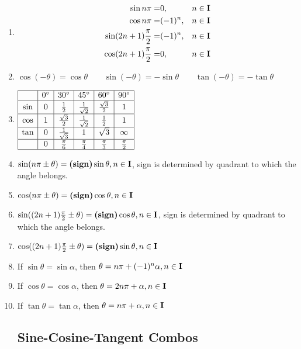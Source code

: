 \documentclass[a4paper]{article}
\begin{document}
\begin{enumerate}
\item
\begin{eqnarray}
\sin n \pi = & 0, & n\in \mathbf{I} \\
\cos n \pi = & (-1)^n, & n\in \mathbf{I} \\
\sin (2n+1)\frac{\pi}{2} = & (-1)^n, & n \in \mathbf{I} \\
\cos (2n+1)\frac{\pi}{2} = & 0, & n \in \mathbf{I}
\end{eqnarray}

\item
$\cos (-\theta) = \cos \theta
\qquad
\sin (-\theta) = -\sin \theta
\qquad
\tan (-\theta) = -\tan \theta$

\item
$\begin{array}{|c|c|c|c|c|c|}
\hline
 & 0^\circ & 30^\circ & 45 ^\circ & 60 ^\circ & 90 ^\circ \\
\hline
\sin & 0 & \frac{1}{2} & \frac{1}{\sqrt{2}} & \frac{\sqrt 3}{2} & 1 \\
\hline
\cos & 1 & \frac{\sqrt 3}{2} & \frac{1}{\sqrt{2}} & \frac{1}{2} & 1 \\
\hline
\tan & 0 & \frac{1}{\sqrt 3} & 1 & \sqrt 3 & \infty \\
\hline
 & 0 & \frac{\pi}{6} & \frac{\pi}{4} & \frac{\pi}{3} & \frac{\pi}{2}\\
\hline
\end{array}$


\item
$\sin (n\pi \pm \theta) = \textbf{(sign)} \sin \theta, n \in \mathbf{I}$, sign is determined by quadrant to which the angle belongs.
\item
$\cos (n\pi \pm \theta) = \textbf{(sign)} \cos \theta, n \in \mathbf{I}$


\item
$\sin ((2n+1)\frac{\pi}{2} \pm \theta) = \textbf{(sign)} \cos \theta, n \in \mathbf{I}$, sign is determined by quadrant to which the angle belongs.
\item
$\cos ((2n+1)\frac{\pi}{2} \pm \theta) = \textbf{(sign)} \sin \theta, n \in \mathbf{I}$

\item
If $\sin \theta = \sin \alpha$, then $\theta=n\pi + (-1)^n \alpha, n \in \mathbf{I}$
\item
If $\cos \theta = \cos \alpha$, then $\theta=2n\pi + \alpha, n \in \mathbf{I}$
\item
If $\tan \theta = \tan \alpha$, then $\theta=n\pi + \alpha, n \in \mathbf{I}$

\subsection{Sine-Cosine-Tangent Combos}


\end{enumerate}
\end{document}
